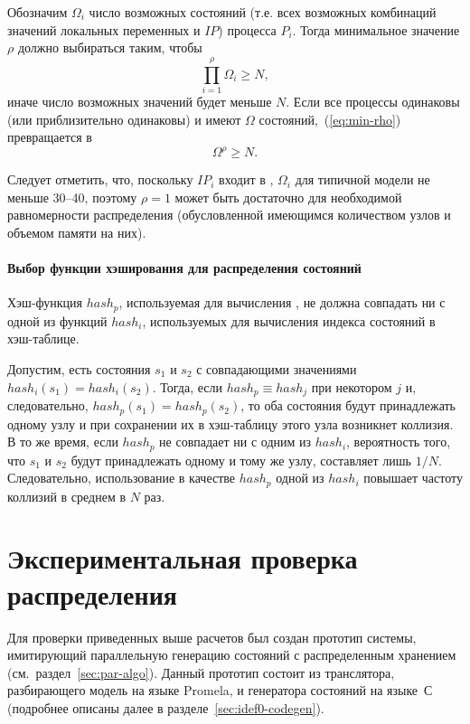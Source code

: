 Обозначим $\Omega_i$ число возможных состояний (т.е. всех возможных комбинаций значений
локальных переменных и $IP$) процесса $P_i$. Тогда минимальное значение $\rho$ должно
выбираться таким, чтобы
\begin{equation}
  \label{eq:min-rho}
  \prod_{i = 1}^\rho{\Omega_i} \geq N,
\end{equation}
иначе число возможных значений  будет меньше $N$. Если все процессы
одинаковы (или приблизительно одинаковы) и имеют $\Omega$ состояний,~(\ref{eq:min-rho})
превращается в 
\begin{equation}
  \label{eq:min-rho-homo}
  \Omega^\rho \geq N.
\end{equation}

Следует отметить, что, поскольку $IP_i$ входит в , $\Omega_i$ для типичной
модели не меньше 30--40, поэтому $\rho = 1$ может быть достаточно для необходимой
равномерности распределения (обусловленной имеющимся количеством узлов и объемом памяти на
них).

\paragraph{Выбор функции хэширования для распределения состояний}

Хэш-функция $hash_p$, используемая для вычисления , не должна совпадать ни
с одной из функций $hash_i$, используемых для вычисления индекса состояний в
хэш-таблице. 

Допустим, есть состояния $s_1$ и $s_2$ с совпадающими значениями $hash_i(s_1) =
hash_i(s_2)$. Тогда, если $hash_p \equiv hash_j$ при некотором $j$ и, следовательно,
$hash_p(s_1) = hash_p(s_2)$, то оба состояния будут принадлежать одному узлу и при
сохранении их в хэш-таблицу этого узла возникнет коллизия. В то же время, если $hash_p$ не
совпадает ни с одним из $hash_i$, вероятность того, что $s_1$ и $s_2$ будут принадлежать
одному и тому же узлу, составляет лишь $1/N$. Следовательно, использование в качестве
$hash_p$ одной из $hash_i$ повышает частоту коллизий в среднем в $N$ раз.

\section{Экспериментальная проверка распределения}
\label{sec:paremu-test}

Для проверки приведенных выше расчетов был создан прототип системы, имитирующий
параллельную генерацию состояний с распределенным хранением
(см.~раздел~\ref{sec:par-algo}). Данный прототип состоит из транслятора, разбирающего
модель на языке Promela, и генератора состояний на языке~С (подробнее описаны далее в
разделе~\ref{sec:idef0-codegen}).

